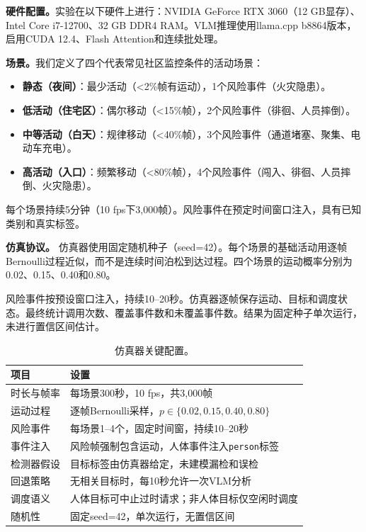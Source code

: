 \documentclass[a4paper,10pt]{ctexart}
\begin{document}
\textbf{硬件配置。}实验在以下硬件上进行：NVIDIA GeForce RTX 3060（12 GB显存）、Intel Core i7-12700、32 GB DDR4 RAM。VLM推理使用llama.cpp b8864版本，启用CUDA 12.4、Flash Attention和连续批处理。

\textbf{场景。}我们定义了四个代表常见社区监控条件的活动场景：

\begin{itemize}
\item \textbf{静态（夜间）}：最少活动（\textless2\%帧有运动），1个风险事件（火灾隐患）。
\item \textbf{低活动（住宅区）}：偶尔移动（\textless15\%帧），2个风险事件（徘徊、人员摔倒）。
\item \textbf{中等活动（白天）}：规律移动（\textless40\%帧），3个风险事件（通道堵塞、聚集、电动车充电）。
\item \textbf{高活动（入口）}：频繁移动（\textless80\%帧），4个风险事件（闯入、徘徊、人员摔倒、火灾隐患）。
\end{itemize}

每个场景持续5分钟（10 fps下3,000帧）。风险事件在预定时间窗口注入，具有已知类别和真实标签。

\textbf{仿真协议。}
仿真器使用固定随机种子（seed=42）。每个场景的基础活动用逐帧Bernoulli过程近似，而不是连续时间泊松到达过程。四个场景的运动概率分别为0.02、0.15、0.40和0.80。

风险事件按预设窗口注入，持续10--20秒。仿真器逐帧保存运动、目标和调度状态。最终统计调用次数、覆盖事件数和未覆盖事件数。结果为固定种子单次运行，未进行置信区间估计。

\begin{table}[t]
\centering
\caption{仿真器关键配置。}
\label{tab:simulator}
\small
\begin{tabular}{ll}
\toprule
项目 & 设置 \\
\midrule
时长与帧率 & 每场景300秒，10 fps，共3,000帧 \\
运动过程 & 逐帧Bernoulli采样，$p\in\{0.02,0.15,0.40,0.80\}$ \\
风险事件 & 每场景1--4个，固定时间窗，持续10--20秒 \\
事件注入 & 风险帧强制包含运动，人体事件注入\texttt{person}标签 \\
检测器假设 & 目标标签由仿真器给定，未建模漏检和误检 \\
回退策略 & 无相关目标时，每10秒允许一次VLM分析 \\
调度语义 & 人体目标可中止过时请求；非人体目标仅空闲时调度 \\
随机性 & 固定seed=42，单次运行，无置信区间 \\
\bottomrule
\end{tabular}
\end{table}
\end{document}
